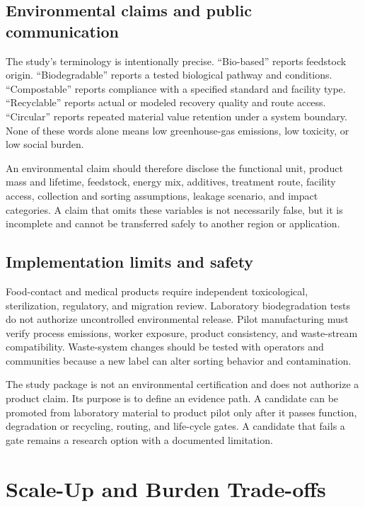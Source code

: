 \documentclass[conference]{IEEEtran}
\begin{document}
\subsection{Environmental claims and public communication}

The study's terminology is intentionally precise. “Bio-based” reports feedstock origin. “Biodegradable” reports a tested biological pathway and conditions. “Compostable” reports compliance with a specified standard and facility type. “Recyclable” reports actual or modeled recovery quality and route access. “Circular” reports repeated material value retention under a system boundary. None of these words alone means low greenhouse-gas emissions, low toxicity, or low social burden.

An environmental claim should therefore disclose the functional unit, product mass and lifetime, feedstock, energy mix, additives, treatment route, facility access, collection and sorting assumptions, leakage scenario, and impact categories. A claim that omits these variables is not necessarily false, but it is incomplete and cannot be transferred safely to another region or application.

\subsection{Implementation limits and safety}

Food-contact and medical products require independent toxicological, sterilization, regulatory, and migration review. Laboratory biodegradation tests do not authorize uncontrolled environmental release. Pilot manufacturing must verify process emissions, worker exposure, product consistency, and waste-stream compatibility. Waste-system changes should be tested with operators and communities because a new label can alter sorting behavior and contamination.

 The study package is not an environmental certification and does not authorize a product claim. Its purpose is to define an evidence path. A candidate can be promoted from laboratory material to product pilot only after it passes function, degradation or recycling, routing, and life-cycle gates. A candidate that fails a gate remains a research option with a documented limitation.

\section{Scale-Up and Burden Trade-offs}
\end{document}
